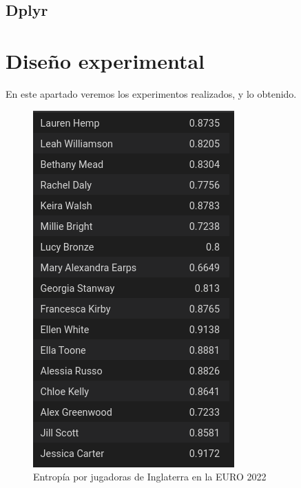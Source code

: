 \subsection{Dplyr}


\section{Diseño experimental}
En este apartado veremos los experimentos realizados, y lo obtenido.

\begin{figure}[ht!]
    \centering
     \includegraphics[width=\textwidth]{./img/entrop_engl.png}
     \caption{Entropía por jugadoras de Inglaterra en la EURO 2022}
     \label{img:ent:eng}
\end{figure}


